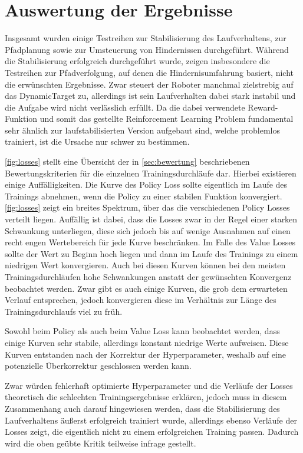 \chapter{Auswertung der Ergebnisse}
Insgesamt wurden einige Testreihen zur Stabilisierung des Laufverhaltens, zur Pfadplanung sowie zur Umsteuerung von Hindernissen durchgeführt.
Während die Stabilisierung erfolgreich durchgeführt wurde, zeigen insbesondere die Testreihen zur Pfadverfolgung, auf denen die Hindernisumfahrung basiert, nicht die erwünschten Ergebnisse.
Zwar steuert der Roboter manchmal zielstrebig auf das DynamicTarget zu, allerdings ist sein Laufverhalten dabei stark instabil und die Aufgabe wird nicht verlässlich erfüllt.
Da die dabei verwendete Reward-Funktion und somit das gestellte Reinforcement Learning Problem fundamental sehr ähnlich zur laufstabilisierten Version aufgebaut sind, welche problemlos trainiert, ist die Ursache nur schwer zu bestimmen.

\autoref{fig:losses} stellt eine Übersicht der in \autoref{sec:bewertung} beschriebenen Bewertungskriterien für die einzelnen Trainingsdurchläufe dar.
Hierbei existieren einige Auffälligkeiten.
Die Kurve des Policy Loss sollte eigentlich im Laufe des Trainings abnehmen, wenn die Policy zu einer stabilen Funktion konvergiert.
\autoref{fig:losses} zeigt ein breites Spektrum, über das die verschiedenen Policy Losses verteilt liegen.
Auffällig ist dabei, dass die Losses zwar in der Regel einer starken Schwankung unterliegen, diese sich jedoch bis auf wenige Ausnahmen auf einen recht engen Wertebereich für jede Kurve beschränken.
Im Falle des Value Losses sollte der Wert zu Beginn hoch liegen und dann im Laufe des Trainings zu einem niedrigen Wert konvergieren.
Auch bei diesen Kurven können bei den meisten Trainingsdurchläufen hohe Schwankungen anstatt der gewünschten Konvergenz beobachtet werden.
Zwar gibt es auch einige Kurven, die grob dem erwarteten Verlauf entsprechen, jedoch konvergieren diese im Verhältnis zur Länge des Trainingsdurchlaufs viel zu früh.

Sowohl beim Policy als auch beim Value Loss kann beobachtet werden, dass einige Kurven sehr stabile, allerdings konstant niedrige Werte aufweisen.
Diese Kurven entstanden nach der Korrektur der Hyperparameter, weshalb auf eine potenzielle Überkorrektur geschlossen werden kann.

Zwar würden fehlerhaft optimierte Hyperparameter und die Verläufe der Losses theoretisch die schlechten Trainingsergebnisse erklären, jedoch muss in diesem Zusammenhang auch darauf hingewiesen werden, dass die Stabilisierung des Laufverhaltens äußerst erfolgreich trainiert wurde, allerdings ebenso Verläufe der Losses zeigt, die eigentlich nicht zu einem erfolgreichen Training passen.
Dadurch wird die oben geübte Kritik teilweise infrage gestellt.

